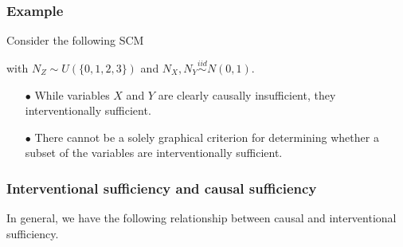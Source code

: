 \documentclass{beamer}
\begin{document}
\begin{frame}
    \frametitle{Example}
    \begin{flushleft}
        Consider the following SCM
    \end{flushleft}
    \begin{flushleft} 
        with $N_Z\sim U(\{0,1,2,3\})$ and $N_X,N_Y \overset{iid}\sim N(0,1)$. \\
    \end{flushleft}
    \begin{itemize}
        \item[$\bullet$] While variables $X$ and $Y$ are clearly causally insufficient, they interventionally sufficient.
        \item[$\bullet$] There cannot be a solely graphical criterion
        for determining whether a subset of the variables are interventionally sufficient.  
    \end{itemize}
\end{frame}

\begin{frame}
    \frametitle{Interventional sufficiency and causal sufficiency}
    \begin{flushleft}
        In general, we have the following relationship between causal and interventional
        sufficiency.
    \end{flushleft}
\end{frame}
\end{document}
